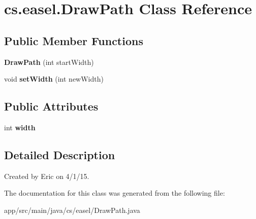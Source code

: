 \hypertarget{classcs_1_1easel_1_1_draw_path}{\section{cs.\+easel.\+Draw\+Path Class Reference}
\label{classcs_1_1easel_1_1_draw_path}
}
\subsection*{Public Member Functions}
\begin{DoxyCompactItemize}
\item 
\hypertarget{classcs_1_1easel_1_1_draw_path_ac815ec0578e48bd32d26764635b00ab2}{{\bfseries Draw\+Path} (int start\+Width)}\label{classcs_1_1easel_1_1_draw_path_ac815ec0578e48bd32d26764635b00ab2}

\item 
\hypertarget{classcs_1_1easel_1_1_draw_path_a21ae81f4c01afc4336d83545364c5d32}{void {\bfseries set\+Width} (int new\+Width)}\label{classcs_1_1easel_1_1_draw_path_a21ae81f4c01afc4336d83545364c5d32}

\end{DoxyCompactItemize}
\subsection*{Public Attributes}
\begin{DoxyCompactItemize}
\item 
\hypertarget{classcs_1_1easel_1_1_draw_path_a01746d060493378ca7ec29c89bb9875d}{int {\bfseries width}}\label{classcs_1_1easel_1_1_draw_path_a01746d060493378ca7ec29c89bb9875d}

\end{DoxyCompactItemize}


\subsection{Detailed Description}
Created by Eric on 4/1/15. 

The documentation for this class was generated from the following file\+:\begin{DoxyCompactItemize}
\item 
app/src/main/java/cs/easel/Draw\+Path.\+java\end{DoxyCompactItemize}
